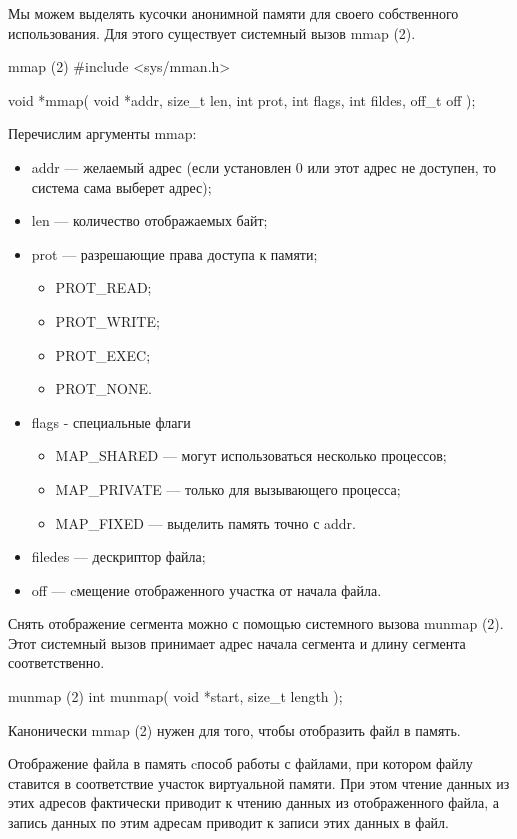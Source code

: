 Мы можем выделять кусочки анонимной памяти для своего собственного использования. Для этого существует системный вызов mmap (2).

\begin{CCode}{mmap (2)}
	#include <sys/mman.h>

	void *mmap(
		void *addr, 
		size_t len, 
		int prot, 
		int flags, 
		int fildes, 
		off_t off
	); \end{CCode}

Перечислим аргументы mmap:

\begin{itemize}
	\item addr --- желаемый адрес (если установлен 0 или этот адрес не доступен, то система сама выберет адрес);
	\item len  --- количество отображаемых байт;
	\item prot --- разрешающие права доступа к памяти;
		\begin{itemize}
			\item PROT\_READ;
			\item PROT\_WRITE;
			\item PROT\_EXEC;
			\item PROT\_NONE.
		\end{itemize}
	\item flags - специальные флаги
		\begin{itemize}
			\item MAP\_SHARED --- могут использоваться несколько процессов;
			\item MAP\_PRIVATE --- только для вызывающего процесса;
			\item MAP\_FIXED --- выделить память точно с addr.
		\end{itemize}
	\item filedes --- дескриптор файла;
	\item off --- cмещение отображенного участка от начала файла.	
\end{itemize}

Снять отображение сегмента  можно с помощью системного вызова munmap (2). Этот системный вызов принимает адрес начала сегмента и длину сегмента соответственно. 

\begin{CCode}{munmap (2)}
	int munmap(
		void *start, 
		size_t length
	); \end{CCode}

\begin{important}
	Канонически mmap (2) нужен для того, чтобы отобразить файл в память.

	\begin{defi}{Отображение файла в память}
		cпособ работы с файлами, при котором файлу ставится в соответствие участок виртуальной памяти. При этом чтение данных из этих адресов фактически приводит к чтению данных из отображенного файла, а запись данных по этим адресам приводит к записи этих данных в файл.
	\end{defi}

\end{important}
